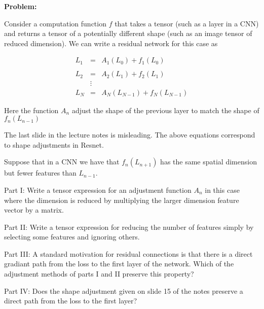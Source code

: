 \documentclass{article}
\begin{document}
\medskip
{\bf Problem:}

Consider a computation function $f$ that takes a tensor (such as a layer
in a CNN) and returns a tensor of a potentially different shape (such as an image
tensor of reduced dimension).  We can write a residual network for this case as 

\begin{eqnarray*}
  L_1 & = & A_1(L_0) + f_1(L_0) \\
  \\
  L_2 & = & A_2(L_1) + f_2(L_1) \\
        & \vdots & \\
  L_N & = & A_N(L_{N-1}) + f_N(L_{N-1})
\end{eqnarray*}


Here the function $A_n$ adjust the shape of the previous layer to match the shape of $f_n(L_{n-1})$

The last slide in the lecture notes is misleading.  The above equations correspond to shape adjustments in Resnet.

Suppose that in a CNN we have that $f_n(L_{n+1})$ has the same spatial dimension but fewer features than $L_{n-1}$. 

Part I: Write a tensor expression for an adjustment function $A_n$ in this case where the dimension is reduced by multiplying the larger dimension feature vector by a matrix.

Part II: Write a tensor expression for reducing the number of features simply by selecting some features and ignoring others.

Part III: A standard motivation for residual connections is that there is a direct gradiant path from the loss to the first layer of the network.  Which of the adjustment methods of parts I and II preserve this property?

Part IV: Does the shape adjustment given on slide 15 of the notes preserve a direct path from the loss to the first layer?
\end{document}
